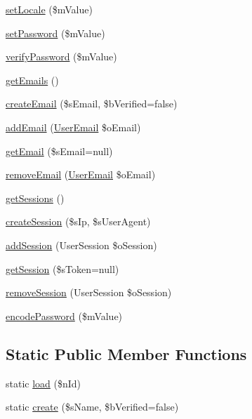 \begin{DoxyCompactItemize}
\item 
\hyperlink{class_user_a119252ef27d6c46a35e026f57da94b1d}{set\-Locale} (\$m\-Value)
\item 
\hyperlink{class_user_afff180c99c7f9f1dc8500556d56626f7}{set\-Password} (\$m\-Value)
\item 
\hyperlink{class_user_ad8bc101663e852d6d617755dc64be755}{verify\-Password} (\$m\-Value)
\item 
\hyperlink{class_user_a3c086413260d34ff4b247aa43312f87f}{get\-Emails} ()
\item 
\hyperlink{class_user_a1c986f4b877980f5dd4354bc8aa3a8d5}{create\-Email} (\$s\-Email, \$b\-Verified=false)
\item 
\hyperlink{class_user_aa8c6769f95795d2c8b50c547f3902943}{add\-Email} (\hyperlink{class_user_email}{User\-Email} \$o\-Email)
\item 
\hyperlink{class_user_a906c866d515ade7d2872084192acabeb}{get\-Email} (\$s\-Email=null)
\item 
\hyperlink{class_user_ae173c13825d8a41ec073485bce7316ed}{remove\-Email} (\hyperlink{class_user_email}{User\-Email} \$o\-Email)
\item 
\hyperlink{class_user_a85ac6cbae24cc1e909af1c5e7dd7df76}{get\-Sessions} ()
\item 
\hyperlink{class_user_aaa072f1ec3ce955b47f47d7bb8ea0a28}{create\-Session} (\$s\-Ip, \$s\-User\-Agent)
\item 
\hyperlink{class_user_aae3853473563d89b9bcc571004c037c6}{add\-Session} (User\-Session \$o\-Session)
\item 
\hyperlink{class_user_af0f27f7985365842c34c2144eb34d260}{get\-Session} (\$s\-Token=null)
\item 
\hyperlink{class_user_a91839d9d286390bb51aa44d3862b71d9}{remove\-Session} (User\-Session \$o\-Session)
\item 
\hyperlink{class_user_a65978063da01806f89e29ed3ea8702bc}{encode\-Password} (\$m\-Value)
\end{DoxyCompactItemize}
\subsection*{Static Public Member Functions}
\begin{DoxyCompactItemize}
\item 
static \hyperlink{class_user_aa54a7ddcb32d6c13e0fec762bd7186f5}{load} (\$n\-Id)
\item 
static \hyperlink{class_user_aa61383c577524e8f1c2e3f9869ec8d87}{create} (\$s\-Name, \$b\-Verified=false)
\end{DoxyCompactItemize}
